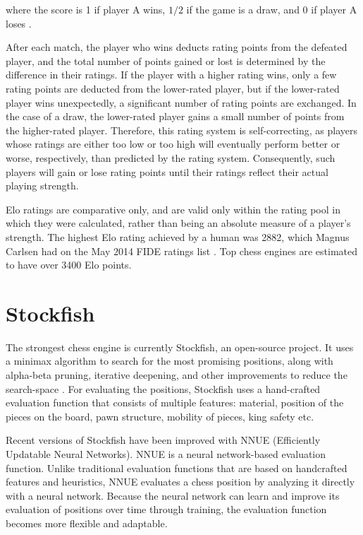 where the score is 1 if player A wins, $1/2$ if the game is a draw, and 0 if player A loses \cite{glickman1999rating}.

After each match, the player who wins deducts rating points from the defeated player, and the total number of points gained or lost is determined by the difference in their ratings. If the player with a higher rating wins, only a few rating points are deducted from the lower-rated player, but if the lower-rated player wins unexpectedly, a significant number of rating points are exchanged. In the case of a draw, the lower-rated player gains a small number of points from the higher-rated player. Therefore, this rating system is self-correcting, as players whose ratings are either too low or too high will eventually perform better or worse, respectively, than predicted by the rating system. Consequently, such players will gain or lose rating points until their ratings reflect their actual playing strength.

Elo ratings are comparative only, and are valid only within the rating pool in which they were calculated, rather than being an absolute measure of a player's strength. The highest Elo rating achieved by a human was 2882, which Magnus Carlsen had on the May 2014 FIDE ratings list \cite{fide-ratings-May2014}. Top chess engines are estimated to have over 3400 Elo points.

\section{Stockfish}
\label{sec:ch3sec3}

The strongest chess engine is currently Stockfish, an open-source project. It uses a minimax algorithm to search for the most promising positions, along with alpha-beta pruning, iterative deepening, and other improvements to reduce the search-space \cite{maharaj2022chess}. For evaluating the positions, Stockfish uses a hand-crafted evaluation function that consists of multiple features: material, position of the pieces on the board, pawn structure, mobility of pieces, king safety etc. \cite{lai2015giraffe}

Recent versions of Stockfish have been improved with NNUE (Efficiently Updatable Neural Networks). NNUE is a neural network-based evaluation function. Unlike traditional evaluation functions that are based on handcrafted features and heuristics, NNUE evaluates a chess position by analyzing it directly with a neural network. Because the neural network can learn and improve its evaluation of positions over time through training, the evaluation function becomes more flexible and adaptable.

